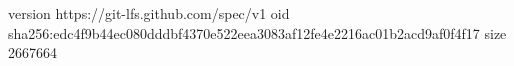 version https://git-lfs.github.com/spec/v1
oid sha256:edc4f9b44ec080dddbf4370e522eea3083af12fe4e2216ac01b2acd9af0f4f17
size 2667664
